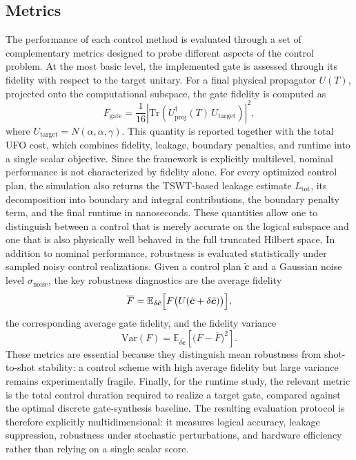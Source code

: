 \subsection{Metrics}
The performance of each control method is evaluated through a set of complementary metrics designed to probe different aspects of the control problem. At the most basic level, the implemented gate is assessed through its fidelity with respect to the target unitary. For a final physical propagator \(U(T)\), projected onto the computational subspace, the gate fidelity is computed as
\begin{equation}
F_{\mathrm{gate}}
=
\frac{1}{16}
\left|
\mathrm{Tr}\!\left(
U_{\mathrm{proj}}^{\dagger}(T)\,U_{\mathrm{target}}
\right)
\right|^2,
\label{eq:validation_gate_fidelity}
\end{equation}
where \(U_{\mathrm{target}}=N(\alpha,\alpha,\gamma)\). This quantity is reported together with the total UFO cost, which combines fidelity, leakage, boundary penalties, and runtime into a single scalar objective. Since the framework is explicitly multilevel, nominal performance is not characterized by fidelity alone. For every optimized control plan, the simulation also returns the TSWT-based leakage estimate \(L_{\mathrm{tot}}\), its decomposition into boundary and integral contributions, the boundary penalty term, and the final runtime in nanoseconds. These quantities allow one to distinguish between a control that is merely accurate on the logical subspace and one that is also physically well behaved in the full truncated Hilbert space. In addition to nominal performance, robustness is evaluated statistically under sampled noisy control realizations. Given a control plan \(\tilde{\bm{c}}\) and a Gaussian noise level \(\sigma_{\mathrm{noise}}\), the key robustness diagnostics are the average fidelity
\begin{equation}
\overline{F}
=
\mathbb{E}_{\delta\tilde{\bm{c}}}
\Bigl[
F\bigl(U(\tilde{\bm{c}}+\delta\tilde{\bm{c}})\bigr)
\Bigr],
\label{eq:validation_average_fidelity}
\end{equation}
the corresponding average gate fidelity, and the fidelity variance
\begin{equation}
\mathrm{Var}(F)
=
\mathbb{E}_{\delta\tilde{\bm{c}}}
\left[
\bigl(F-\overline{F}\bigr)^2
\right].
\label{eq:validation_fidelity_variance}
\end{equation}
These metrics are essential because they distinguish mean robustness from shot-to-shot stability: a control scheme with high average fidelity but large variance remains experimentally fragile. Finally, for the runtime study, the relevant metric is the total control duration required to realize a target gate, compared against the optimal discrete gate-synthesis baseline. The resulting evaluation protocol is therefore explicitly multidimensional: it measures logical accuracy, leakage suppression, robustness under stochastic perturbations, and hardware efficiency rather than relying on a single scalar score.

